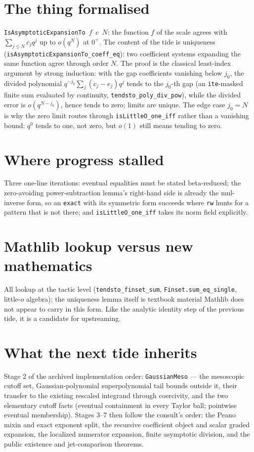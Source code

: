 \documentclass[11pt]{article}
\newcommand{\code}[1]{\texttt{#1}}
\begin{document}
\section{The thing formalised}

\code{IsAsymptoticExpansionTo}~$f$~$c$~$N$: the function $f$ of the
scale agrees with $\sum_{j \le N} c_j q^j$ up to $o(q^N)$ at $0^+$.
The content of the tide is uniqueness
(\code{isAsymptoticExpansionTo\_coeff\_eq}): two coefficient systems
expanding the same function agree through order $N$. The proof is
the classical least-index argument by strong induction: with the
gap coefficients vanishing below $j_0$, the divided polynomial
$q^{-j_0} \sum_j (c_j - e_j) q^j$ tends to the $j_0$-th gap (an
\code{ite}-masked finite sum evaluated by continuity,
\code{tendsto\_poly\_div\_pow}), while the divided error is
$o(q^{N - j_0})$, hence tends to zero; limits are unique. The edge
case $j_0 = N$ is why the zero limit routes through
\code{isLittleO\_one\_iff} rather than a vanishing bound: $q^0$
tends to one, not zero, but $o(1)$ still means tending to zero.

\section{Where progress stalled}

Three one-line iterations: eventual equalities must be stated
beta-reduced; the zero-avoiding power-subtraction lemma's right-hand side is already the
mul-inverse form, so an \code{exact} with its symmetric form succeeds
where \code{rw} hunts for a pattern that is not there; and
\code{isLittleO\_one\_iff} takes its norm field explicitly.

\section{Mathlib lookup versus new mathematics}

All lookup at the tactic level (\code{tendsto\_finset\_sum},
\code{Finset.sum\_eq\_single}, little-$o$ algebra); the uniqueness
lemma itself is textbook material Mathlib does not appear to carry
in this form. Like the analytic identity step of the previous tide,
it is a candidate for upstreaming.

\section{What the next tide inherits}

Stage 2 of the archived implementation order: \code{GaussianMeso} —
the mesoscopic cutoff set, Gaussian-polynomial superpolynomial tail
bounds outside it, their transfer to the existing rescaled integrand
through coercivity, and the two elementary cutoff facts (eventual
containment in every Taylor ball; pointwise eventual membership).
Stages 3--7 then follow the consult's order: the Peano mixin and
exact exponent split, the recursive coefficient object and scalar
graded expansion, the localized numerator expansion, finite
asymptotic division, and the public existence and jet-comparison
theorems.
\end{document}

